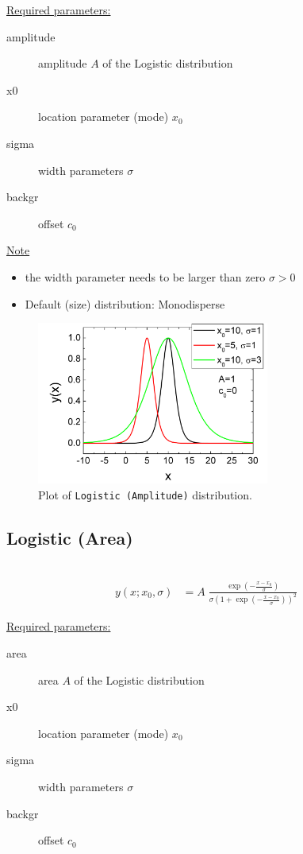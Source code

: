 \uline{Required parameters:}
\begin{description}
    \item[amplitude] amplitude $A$ of the Logistic distribution
    \item[x0] location parameter (mode) $x_0$
    \item[sigma] width parameters $\sigma$
    \item[backgr] offset $c_0$
\end{description}

\uline{Note}
\begin{itemize}
  \item the width parameter needs to be larger than zero $\sigma > 0$
  \item Default (size) distribution: Monodisperse
\end{itemize}

\begin{figure}[htb]
\begin{center}
\includegraphics[width=0.6824\textwidth]{LogisticAmplitude.png}
\end{center}
\caption{Plot of \texttt{Logistic (Amplitude)} distribution.}
\label{fig:LogisticAmplitude}
\end{figure}

\clearpage
\subsection{Logistic (Area)} ~\\
\label{sec:LogisticArea}
\begin{align}
y(x; x_0,\sigma) &= A\; \frac{\exp\left(-\frac{x-x_0}{\sigma}\right)} {\sigma\left(1+\exp\left(-\frac{x-x_0}{\sigma}\right)\right)^2}
\end{align}

\uline{Required parameters:}
\begin{description}
    \item[area] area $A$ of the Logistic distribution
    \item[x0] location parameter (mode) $x_0$
    \item[sigma] width parameters $\sigma$
    \item[backgr] offset $c_0$
\end{description}

